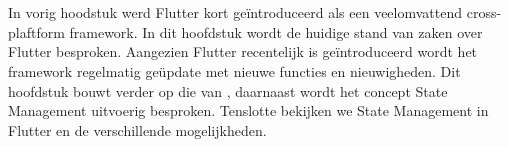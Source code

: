 \chapter{}
\label{ch:stand-van-zaken}

\newcommand\figureWidthModifier{0.6}



%
%

In vorig hoodstuk werd Flutter kort geïntroduceerd als een veelomvattend cross-plaftform framework. In dit hoofdstuk wordt de huidige stand van zaken over Flutter besproken. Aangezien Flutter recentelijk is geïntroduceerd wordt het framework regelmatig geüpdate met nieuwe functies en nieuwigheden. Dit hoofdstuk bouwt verder op die van \autocite{Coninck2019}, daarnaast wordt het concept State Management uitvoerig besproken. Tenslotte bekijken we State Management in Flutter en de verschillende mogelijkheden. 
\newline

